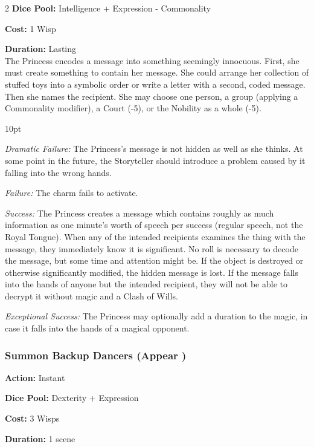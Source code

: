 \begin{multicols}{2}
\noindent \textbf{Dice Pool:} Intelligence + Expression - Commonality

\noindent \textbf{Cost:} 1 Wisp

\noindent \textbf{Duration:} Lasting\\

\noindent The Princess encodes a message into something seemingly innocuous. First, she must create something to contain her message. She could arrange her collection of stuffed toys into a symbolic order or write a letter with a second, coded message. Then she names the recipient. She may choose one person, a group (applying a Commonality modifier), a Court (-5), or the Nobility as a whole (-5). 

\begin{myindentpar}{10pt}

\emph{Dramatic Failure:} The Princess's message is not hidden as well as she thinks. At some point in the future, the Storyteller should introduce a problem caused by it falling into the wrong hands. 

\emph{Failure:} The charm fails to activate.

\emph{Success:} The Princess creates a message which contains roughly as much information as one minute's worth of speech per success (regular speech, not the Royal Tongue). When any of the intended recipients examines the thing with the message, they immediately know it is significant. No roll is necessary to decode the message, but some time and attention might be. If the object is destroyed or otherwise significantly modified, the hidden message is lost. If the message falls into the hands of anyone but the intended recipient, they will not be able to decrypt it without magic and a Clash of Wills.  

\emph{Exceptional Success:} The Princess may optionally add a duration to the magic, in case it falls into the hands of a magical opponent. \end{myindentpar}


\subsubsection*{Summon Backup Dancers (Appear \textbullet\textbullet\textbullet)}
\noindent \textbf{Action:} Instant

\noindent \textbf{Dice Pool:} Dexterity + Expression

\noindent \textbf{Cost:} 3 Wisps

\noindent \textbf{Duration:} 1 scene \\


\end{multicols}

